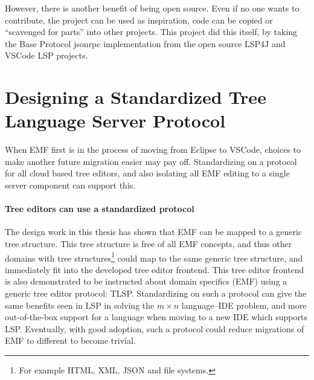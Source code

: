 However, there is another benefit of being \gls{open source}.
Even if no one wants to contribute, the project can be used as inspiration, code can be copied or ``scavenged for parts'' into other projects.
This project did this itself, by taking the Base Protocol jsonrpc implementation from the \gls{open source} LSP4J and VSCode LSP projects.


\section{Designing a Standardized Tree Language Server Protocol}

When \acrshort{EMF} first is in the process of moving from \gls{Eclipse} to \gls{VSCode}, choices to make another future migration easier may pay off.
Standardizing on a protocol for all \gls{cloud} based tree editors, and also isolating all \acrshort{EMF} editing to a single server component can support this.

\paragraph{Tree editors can use a standardized protocol}
The design work in this thesis has shown that \acrshort{EMF} can be mapped to a generic tree structure.
This tree structure is free of all \acrshort{EMF} concepts, and thus other domains with tree structures\footnote{For example HTML, XML, JSON and file systems.} could map to the same generic tree structure, and immediately fit into the developed tree editor frontend.
This tree editor frontend is also demonstrated to be instructed about domain specifics (\acrshort{EMF}) using a generic tree editor protocol: \acrshort{TLSP}.
Standardizing on such a protocol can give the same benefits seen in \acrshort{LSP} in solving the $m\times{}n$ language--\acrshort{IDE} problem, and more out-of-the-box support for a language when moving to a new \acrshort{IDE} which supports \acrshort{LSP}.
Eventually, with good adoption, such a protocol could reduce migrations of \acrshort{EMF} to different  to become trivial.

